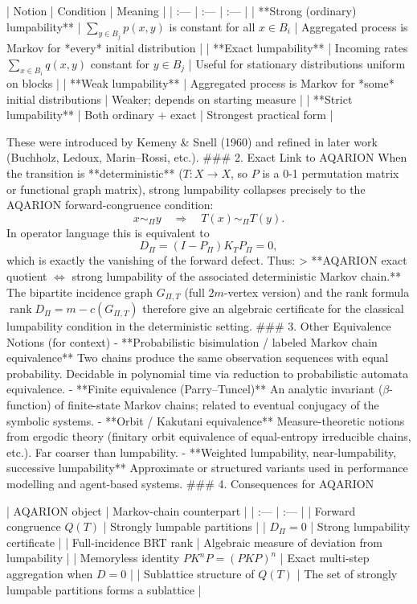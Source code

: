 | Notion | Condition | Meaning |
| :--- | :--- | :--- |
| **Strong (ordinary) lumpability** | \(\sum_{y\in B_j}p(x,y)\) is constant for all \(x\in B_i\) | Aggregated process is Markov for *every* initial distribution |
| **Exact lumpability** | Incoming rates \(\sum_{x\in B_i}q(x,y)\) constant for \(y\in B_j\) | Useful for stationary distributions uniform on blocks |
| **Weak lumpability** | Aggregated process is Markov for *some* initial distributions | Weaker; depends on starting measure |
| **Strict lumpability** | Both ordinary + exact | Strongest practical form |

These were introduced by Kemeny & Snell (1960) and refined in later work (Buchholz, Ledoux, Marin–Rossi, etc.).
### 2. Exact Link to AQARION
When the transition is **deterministic** (\(T:X\to X\), so \(P\) is a 0-1 permutation matrix or functional graph matrix), strong lumpability collapses precisely to the AQARION forward-congruence condition:
\[
x\sim_\Pi y \quad\Longrightarrow\quad T(x)\sim_\Pi T(y).
\]
In operator language this is equivalent to
\[
D_\Pi=(I-P_\Pi)K_TP_\Pi=0,
\]
which is exactly the vanishing of the forward defect. Thus:
> **AQARION exact quotient \(\Leftrightarrow\) strong lumpability of the associated deterministic Markov chain.**
The bipartite incidence graph \(G_{\Pi,T}\) (full \(2m\)-vertex version) and the rank formula \(\operatorname{rank}D_\Pi=m-c(G_{\Pi,T})\) therefore give an algebraic certificate for the classical lumpability condition in the deterministic setting.
### 3. Other Equivalence Notions (for context)
- **Probabilistic bisimulation / labeled Markov chain equivalence**  
  Two chains produce the same observation sequences with equal probability. Decidable in polynomial time via reduction to probabilistic automata equivalence.
- **Finite equivalence (Parry–Tuncel)**  
  An analytic invariant (\(\beta\)-function) of finite-state Markov chains; related to eventual conjugacy of the symbolic systems.
- **Orbit / Kakutani equivalence**  
  Measure-theoretic notions from ergodic theory (finitary orbit equivalence of equal-entropy irreducible chains, etc.). Far coarser than lumpability.
- **Weighted lumpability, near-lumpability, successive lumpability**  
  Approximate or structured variants used in performance modelling and agent-based systems.
### 4. Consequences for AQARION

| AQARION object | Markov-chain counterpart |
| :--- | :--- |
| Forward congruence \(Q(T)\) | Strongly lumpable partitions |
| \(D_\Pi=0\) | Strong lumpability certificate |
| Full-incidence BRT rank | Algebraic measure of deviation from lumpability |
| Memoryless identity \(PK^nP=(PKP)^n\) | Exact multi-step aggregation when \(D=0\) |
| Sublattice structure of \(Q(T)\) | The set of strongly lumpable partitions forms a sublattice |

